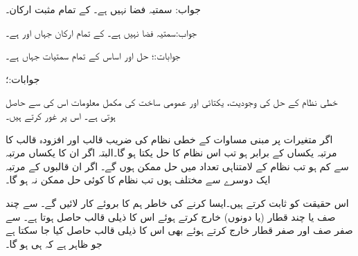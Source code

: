 جواب: سمتیہ فضا نہیں ہے۔
 کے تمام  مثبت ارکان۔

جواب:سمتیہ فضا نہیں ہے۔
 کے تمام ارکان جہاں  اور  ہے۔

جوابات:؛ حل  اور اساس 
 کے تمام سمتیات جہاں  ہے۔

جوابات:؛ 

خطی نظام کے حل کی وجودیت، یکتائی اور عمومی ساخت کی مکمل معلومات اس کی  سے حاصل ہوتی ہے۔ اس پر غور کرتے ہیں۔

اگر  متغیرات پر مبنی مساوات کے خطی نظام کی  ضریب  قالب اور افزودہ قالب کا مرتبہ یکساں  کے برابر ہو تب اس نظام کا حل یکتا ہو گا۔البتہ اگر ان کا یکساں مرتبہ  سے کم ہو تب نظام کے لامتناہی تعداد میں حل ممکن ہوں گے۔ اگر ان قالبوں کے مرتبہ ایک دوسرے سے مختلف ہوں تب نظام کا کوئی حل ممکن نہ ہو گا۔

اس حقیقت کو ثابت کرتے ہیں۔ایسا کرنے کی خاطر ہم  کا  بروئے کار لائیں گے۔ سے چند صف یا چند قطار (یا دونوں) خارج کرتے ہوئے اس کا ذیلی قالب حاصل ہوتا ہے۔  سے صفر صف اور صفر قطار خارج کرتے ہوئے بھی اس کا ذیلی قالب حاصل کیا جا سکتا ہے جو ظاہر ہے کہ  ہی ہو گا۔

